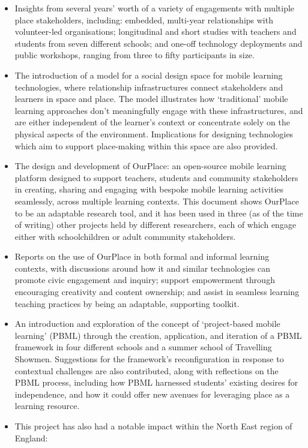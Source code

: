 \begin{itemize}
    \item Insights from several years' worth of a variety of engagements with multiple place stakeholders, including: embedded, multi-year relationships with volunteer-led organisations; longitudinal and short studies with teachers and students from seven different schools; and one-off technology deployments and public workshops, ranging from three to fifty participants in size.
    \item The introduction of a model for a social design space for mobile learning technologies, where relationship infrastructures connect stakeholders and learners in space and place. The model illustrates how `traditional' mobile learning approaches don’t meaningfully engage with these infrastructures, and are either independent of the learner’s context or concentrate solely on the physical aspects of the environment. Implications for designing technologies which aim to support place-making within this space are also provided.
    \item The design and development of OurPlace: an open-source mobile learning platform designed to support teachers, students and community stakeholders in creating, sharing and engaging with bespoke mobile learning activities seamlessly, across multiple learning contexts. This document shows OurPlace to be an adaptable research tool, and it has been used in three (as of the time of writing) other projects held by different researchers, each of which engage either with schoolchildren or adult community stakeholders.
    \item Reports on the use of OurPlace in both formal and informal learning contexts, with discussions around how it and similar technologies can promote civic engagement and inquiry; support empowerment through encouraging creativity and content ownership; and assist in seamless learning teaching practices by being an adaptable, supporting toolkit.
    \item An introduction and exploration of the concept of `project-based mobile learning' (PBML) through the creation, application, and iteration of a PBML framework in four different schools and a summer school of Travelling Showmen. Suggestions for the framework's reconfiguration in response to contextual challenges are also contributed, along with reflections on the PBML process, including how PBML harnessed students’ existing desires for independence, and how it could offer new avenues for leveraging place as a learning resource.
    \item This project has also had a notable impact within the North East region of England:

\end{itemize}
